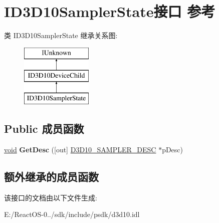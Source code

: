 \hypertarget{interface_i_d3_d10_sampler_state}{}\section{I\+D3\+D10\+Sampler\+State接口 参考}
\label{interface_i_d3_d10_sampler_state}
类 I\+D3\+D10\+Sampler\+State 继承关系图\+:\begin{figure}[H]
\begin{center}
\leavevmode
\includegraphics[height=3.000000cm]{interface_i_d3_d10_sampler_state}
\end{center}
\end{figure}
\subsection*{Public 成员函数}
\begin{DoxyCompactItemize}
\item 
\mbox{\label{interface_i_d3_d10_sampler_state_aec883ee7ac083f28e8fd0bedb3085635}} 
\hyperlink{interfacevoid}{void} {\bfseries Get\+Desc} (\mbox{[}out\mbox{]} \hyperlink{struct_d3_d10___s_a_m_p_l_e_r___d_e_s_c}{D3\+D10\+\_\+\+S\+A\+M\+P\+L\+E\+R\+\_\+\+D\+E\+SC} $\ast$p\+Desc)
\end{DoxyCompactItemize}
\subsection*{额外继承的成员函数}


该接口的文档由以下文件生成\+:\begin{DoxyCompactItemize}
\item 
E\+:/\+React\+O\+S-\/0../sdk/include/psdk/d3d10.\+idl\end{DoxyCompactItemize}
